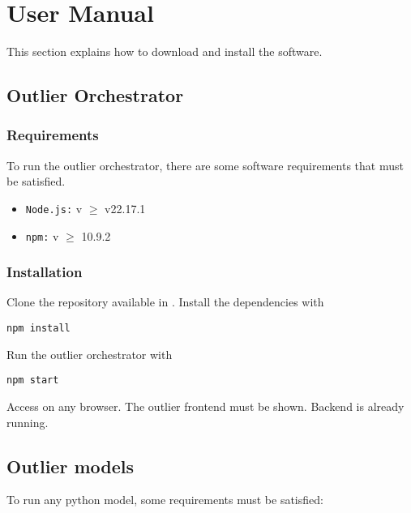 \chapter{User Manual}

This section explains how to download and install the software.

\section{Outlier Orchestrator}

\subsection{Requirements}

To run the outlier orchestrator, there are some software requirements that must be satisfied.

\begin{itemize}
    \item \texttt{Node.js:} v $\geq$ v22.17.1
    \item \texttt{\ac{npm}:} v $\geq$ 10.9.2
\end{itemize}

\subsection{Installation}

Clone the repository available in \autocite{OutlierClassifierOutlier_orchestrator2025a}. Install the dependencies with 

\begin{lstlisting}[caption={Using \ac{npm} to install dependencies}]
    npm install 
\end{lstlisting}

Run the outlier orchestrator with

\begin{lstlisting}[caption={Running the outlier orchestrator}]
    npm start
\end{lstlisting}

Access  on any browser. The outlier frontend must be shown. Backend is already running.

\section{Outlier models}

To run any python model, some requirements must be satisfied:


